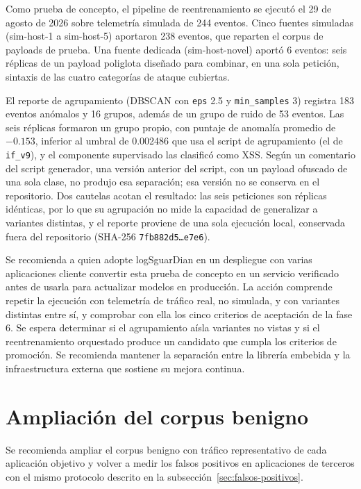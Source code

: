 Como prueba de concepto, el pipeline de reentrenamiento se ejecutó el 29 de agosto de 2026 sobre telemetría simulada de 244 eventos. Cinco fuentes simuladas (sim-host-1 a sim-host-5) aportaron 238 eventos, que reparten el corpus de payloads de prueba. Una fuente dedicada (sim-host-novel) aportó 6 eventos: seis réplicas de un payload poliglota diseñado para combinar, en una sola petición, sintaxis de las cuatro categorías de ataque cubiertas. 

El reporte de agrupamiento (DBSCAN con \texttt{eps} 2.5 y \texttt{min\_samples} 3) registra 183 eventos anómalos y 16 grupos, además de un grupo de ruido de 53 eventos. Las seis réplicas formaron un grupo propio, con puntaje de anomalía promedio de $-0.153$, inferior al umbral de 0.002486 que usa el script de agrupamiento (el de \texttt{if\_v9}), y el componente supervisado las clasificó como XSS. Según un comentario del script generador, una versión anterior del script, con un payload ofuscado de una sola clase, no produjo esa separación; esa versión no se conserva en el repositorio. Dos cautelas acotan el resultado: las seis peticiones son réplicas idénticas, por lo que su agrupación no mide la capacidad de generalizar a variantes distintas, y el reporte proviene de una sola ejecución local, conservada fuera del repositorio (SHA-256 \texttt{7fb882d5\ldots e7e6}).

Se recomienda a quien adopte logSguarDian en un despliegue con varias aplicaciones cliente convertir esta prueba de concepto en un servicio verificado antes de usarla para actualizar modelos en producción. La acción comprende repetir la ejecución con telemetría de tráfico real, no simulada, y con variantes distintas entre sí, y comprobar con ella los cinco criterios de aceptación de la fase 6. Se espera determinar si el agrupamiento aísla variantes no vistas y si el reentrenamiento orquestado produce un candidato que cumpla los criterios de promoción. Se recomienda mantener la separación entre la librería embebida y la infraestructura externa que sostiene su mejora continua.

\section{Ampliación del corpus benigno}\label{sec:recomendacion-corpus-benigno}

Se recomienda ampliar el corpus benigno con tráfico representativo de cada aplicación objetivo y volver a medir los falsos positivos en aplicaciones de terceros con el mismo protocolo descrito en la subsección~\ref{sec:falsos-positivos}.

